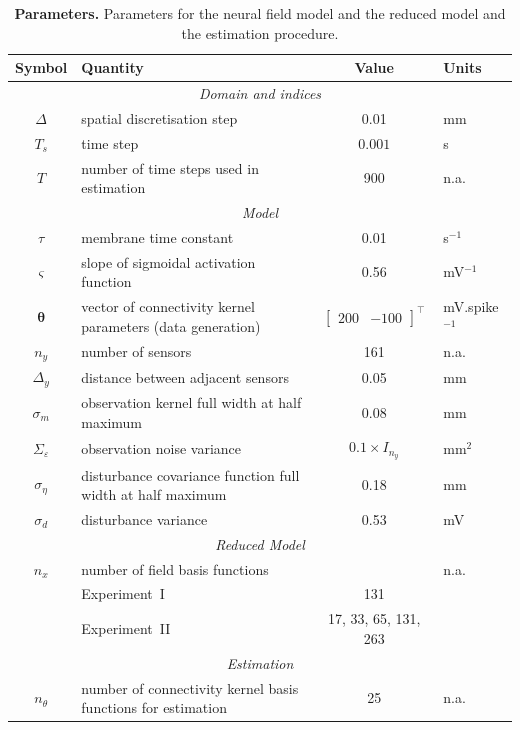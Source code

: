 \documentclass[review,authoryear,3p]{elsarticle}
\begin{document}
\begin{table}[!ht]
\begin{tabular}{|c|l|c|l|}
	\hline
	\textbf{Symbol} & \textbf{Quantity} & \textbf{Value} & \textbf{Units}\\
	\hline
	\multicolumn{4}{|c|}{\emph{Domain and indices}}\\
	\hline
	$\Delta$ & spatial discretisation step & 0.01 & mm \\
	$T_s$ & time step & $0.001$ & s\\
	$T$ & number of time steps used in estimation & 900 & n.a.\\
	\hline 
\multicolumn{4}{|c|}{\emph{Model}}\\
	\hline
	$\tau$ & membrane time constant & 0.01 & s$^{-1}$ \\
	$\varsigma$ & slope of sigmoidal activation function & 0.56 \citep{Wendling2005} & mV$^{-1}$\\
	$\boldsymbol{\theta}$ & vector of connectivity kernel parameters (data generation) & $\left[\begin{array}{cc}
	200 & -100
	\end{array}
	\right]^{\top}$ & mV.spike$^{-1}$\\
	$n_y$ & number of sensors & 161 & n.a.\\ 
	$\Delta_y$ & distance between adjacent sensors & 0.05 & mm\\
	$\sigma_{m}$ & observation kernel full width at half maximum & 0.08 & mm \\
	$\Sigma_{\varepsilon}$ & observation noise variance & $0.1 \times I_{n_y}$ & mm$^2$ \\
	$\sigma_{\eta}$& disturbance covariance function full width at half maximum & 0.18 & mm\\
	$\sigma_{d}$ & disturbance variance & 0.53 & mV \\
	\hline 
	\multicolumn{4}{|c|}{\emph{Reduced Model}}\\
	\hline
	$n_x$ & number of field basis functions&& n.a.\\
	$   $ &Experiment~I&131&\\
	$   $ &Experiment~II&17, 33, 65, 131, 263&\\ 
	\hline 
	\multicolumn{4}{|c|}{\emph{Estimation}}\\ 
	\hline
	$n_{\theta}$&number of connectivity kernel basis functions for estimation&25&n.a.\\
	\hline 
\end{tabular}
\caption{\textbf{Parameters.} Parameters for the neural field model and the reduced model and the estimation procedure.}
\label{tab:Parameters}
\end{table} 
\end{document}
